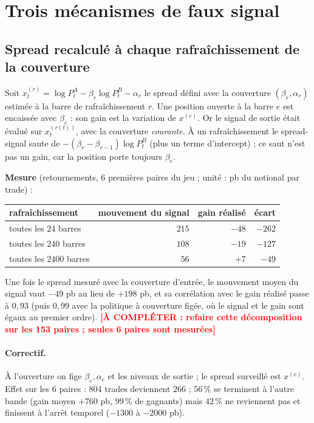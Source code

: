 \documentclass[11pt,a4paper]{article}
\theoremstyle{remark}
\newcommand{\acompleter}[1]{\textcolor{red}{\textbf{[À COMPLÉTER : #1]}}}
\begin{document}
\section{Trois mécanismes de faux signal}\label{sec:meca}

\subsection{Spread recalculé à chaque rafraîchissement de la couverture}

Soit $x^{(r)}_t=\log P^A_t-\beta_r\log P^B_t-\alpha_r$ le spread défini avec la couverture $(\beta_r,\alpha_r)$ estimée à la barre de rafraîchissement $r$. Une position ouverte à la barre $e$ est
encaissée avec $\beta_e$ : son gain est la variation de $x^{(e)}$. Or le signal de sortie était évalué sur $x^{(r(t))}_t$, avec la couverture \emph{courante}. À un rafraîchissement le spread-signal saute de
$-(\beta_{r}-\beta_{r-1})\log P^B_t$ (plus un terme d'intercept) ; ce saut n'est pas un gain, car la position porte toujours $\beta_e$.

\textbf{Mesure} (retournements, $6$ premières paires du jeu ; unité : pb du notional par trade) :

\begin{center}
\small
\begin{tabular}{lrrr}
\toprule
rafraîchissement & mouvement du signal & gain réalisé & écart\\
\midrule
toutes les $24$ barres & $215$ & $-48$ & $-262$\\
toutes les $240$ barres & $108$ & $-19$ & $-127$\\
toutes les $2400$ barres & $56$ & $+7$ & $-49$\\
\bottomrule
\end{tabular}
\end{center}

Une fois le spread mesuré avec la couverture d'entrée, le mouvement moyen du signal vaut $-49$ pb au lieu de $+198$ pb, et sa corrélation avec le gain réalisé passe à $0{,}93$ (puis $0{,}99$ avec la politique à couverture figée, où le signal et le gain sont égaux au premier ordre).
\acompleter{refaire cette décomposition sur les 153 paires ; seules 6 paires sont mesurées}

\paragraph{Correctif.} À l'ouverture on fige $\beta_e,\alpha_e$ et les niveaux de sortie ; le spread surveillé est $x^{(e)}$. Effet sur les $6$ paires : $804$ trades deviennent $266$ ; $56\,\%$ se terminent à l'autre bande (gain moyen $+760$ pb,
$99\,\%$ de gagnants) mais $42\,\%$ ne reviennent pas et finissent à l'arrêt temporel ($-1300$ à $-2000$ pb).
\end{document}
